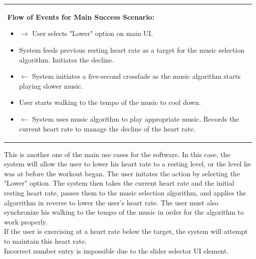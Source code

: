 \documentclass[letterpaper,english, 12pt]{scrreprt}
\begin{document}
\begin{center}
\begin{tabular}{|C{15cm}|}
\begin{flushleft}
                                \textbf{Flow of Events for Main Success Scenario: }
                        \end{flushleft}
                                \begin{itemize}
                                        \item $\rightarrow$ User selects "Lower" option on main UI.
                                        \item System feeds previous resting heart rate as a target for the music selection algorithm. Initiates the decline.
                                        \item $\leftarrow$ System initiates a five-second crossfade as the music algorithm starts playing slower music.
                                        \item User starts walking to the tempo of the music to cool down.
                                        \item $\leftarrow$ System uses music algorithm to play appropriate music. Records the current heart rate to manage the decline of the heart rate.
                                \end{itemize}
                \hline
        \end{tabular}
\end{center}

This is another one of the main use cases for the software. In this case, the system will allow the user to lower his heart rate to a resting level, or the level he was at before the workout began. The user initates the action by selecting the "Lower" option. The system then takes the current heart rate and the initial resting heart rate, passes them to the music selection algorithm, and applies the algorrithm in reverse to lower the user's heart rate. The user must also synchronize his walking to the tempo of the music in order for the algorithm to work properly.\\
If the user is exercising at a heart rate below the target, the system will attempt to maintain this heart rate.\\
Incorrect number entry is impossible due to the slider selector UI element.\\
\end{document}
